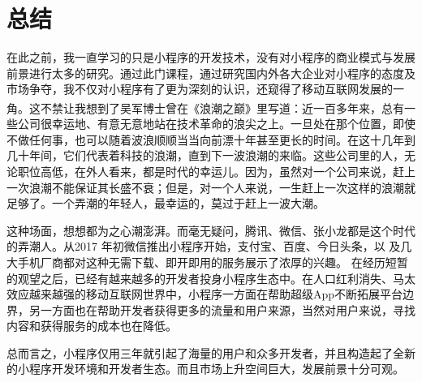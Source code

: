 \documentclass{article}
\begin{document}
\section{总结}
在此之前，我一直学习的只是小程序的开发技术，没有对小程序的商业模式与发展前景进行太多的研究。通过此门课程，通过研究国内外各大企业对小程序的态度及市场争夺，我不仅对小程序有了更为深刻的认识，还窥得了移动互联网发展的一角。这不禁让我想到了吴军博士曾在《浪潮之巅》\textsuperscript{\citep{lczd}}里写道：近一百多年来，总有一些公司很幸运地、有意无意地站在技术革命的浪尖之上。一旦处在那个位置，即使不做任何事，也可以随着波浪顺顺当当向前漂十年甚至更长的时间。在这十几年到几十年间，它们代表着科技的浪潮，直到下一波浪潮的来临。这些公司里的人，无论职位高低，在外人看来，都是时代的幸运儿。因为，虽然对一个公司来说，赶上一次浪潮不能保证其长盛不衰；但是，对一个人来说，一生赶上一次这样的浪潮就足够了。一个弄潮的年轻人，最幸运的，莫过于赶上一波大潮。\par
这种场面，想想都为之心潮澎湃。而毫无疑问，腾讯、微信、张小龙都是这个时代的弄潮人。从2017 年初微信推出小程序开始，支付宝、百度、今日头条，以 及几大手机厂商都对这种无需下载、即开即用的服务展示了浓厚的兴趣。 在经历短暂的观望之后，已经有越来越多的开发者投身小程序生态中。在人口红利消失、马太效应越来越强的移动互联网世界中，小程序一方面在帮助超级App不断拓展平台边界，另一方面也在帮助开发者获得更多的流量和用户来源，当然对用户来说，寻找内容和获得服务的成本也在降低。\par
总而言之，小程序仅用三年就引起了海量的用户和众多开发者，并且构造起了全新的小程序开发环境和开发者生态。而且市场上升空间巨大，发展前景十分可观。
\par
\end{document}
